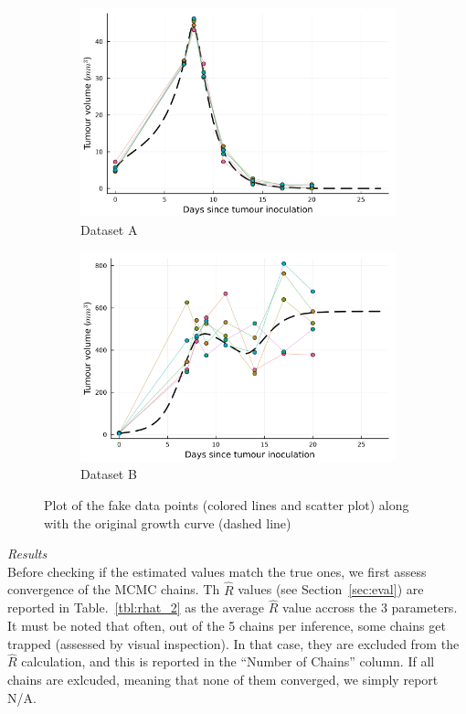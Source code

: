 \documentclass[11pt]{article}
\begin{document}
\begin{figure}[!h]
    \centering
    \begin{subfigure}{.5\linewidth}
        \centering\includegraphics[scale=0.4]{model_validation/fd_1.png}
        \caption{Dataset A}
    \end{subfigure}%
    \begin{subfigure}{.5\linewidth}
        \centering\includegraphics[scale=0.4]{model_validation/fd_2.png}
        \caption{Dataset B}
    \end{subfigure}
    \caption{Plot of the fake data points (colored lines and scatter plot) along with the original growth curve (dashed line)}
    \label{fig:fd_1}
\end{figure}

\textit{Results}\\[5pt] 
Before checking if the estimated values match the true ones, we first assess convergence of the MCMC chains. Th $\hat{R}$ values (see Section~\ref{sec:eval}) are reported in Table.~\ref{tbl:rhat_2} as the average $\hat{R}$ value accross the 3 parameters. It must be noted that often, out of the 5 chains per inference, some chains  get trapped (assessed by visual inspection). In that case, they are excluded from the $\hat{R}$ calculation, and this is reported in the ``Number of Chains'' column. If all chains are exlcuded, meaning that none of them converged, we simply report N/A.
\end{document}
